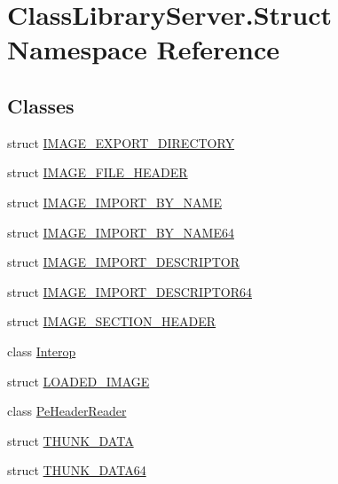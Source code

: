 \hypertarget{namespace_class_library_server_1_1_struct}{}\section{Class\+Library\+Server.\+Struct Namespace Reference}
\label{namespace_class_library_server_1_1_struct}
\subsection*{Classes}
\begin{DoxyCompactItemize}
\item 
struct \mbox{\hyperlink{struct_class_library_server_1_1_struct_1_1_i_m_a_g_e___e_x_p_o_r_t___d_i_r_e_c_t_o_r_y}{I\+M\+A\+G\+E\+\_\+\+E\+X\+P\+O\+R\+T\+\_\+\+D\+I\+R\+E\+C\+T\+O\+RY}}
\item 
struct \mbox{\hyperlink{struct_class_library_server_1_1_struct_1_1_i_m_a_g_e___f_i_l_e___h_e_a_d_e_r}{I\+M\+A\+G\+E\+\_\+\+F\+I\+L\+E\+\_\+\+H\+E\+A\+D\+ER}}
\item 
struct \mbox{\hyperlink{struct_class_library_server_1_1_struct_1_1_i_m_a_g_e___i_m_p_o_r_t___b_y___n_a_m_e}{I\+M\+A\+G\+E\+\_\+\+I\+M\+P\+O\+R\+T\+\_\+\+B\+Y\+\_\+\+N\+A\+ME}}
\item 
struct \mbox{\hyperlink{struct_class_library_server_1_1_struct_1_1_i_m_a_g_e___i_m_p_o_r_t___b_y___n_a_m_e64}{I\+M\+A\+G\+E\+\_\+\+I\+M\+P\+O\+R\+T\+\_\+\+B\+Y\+\_\+\+N\+A\+M\+E64}}
\item 
struct \mbox{\hyperlink{struct_class_library_server_1_1_struct_1_1_i_m_a_g_e___i_m_p_o_r_t___d_e_s_c_r_i_p_t_o_r}{I\+M\+A\+G\+E\+\_\+\+I\+M\+P\+O\+R\+T\+\_\+\+D\+E\+S\+C\+R\+I\+P\+T\+OR}}
\item 
struct \mbox{\hyperlink{struct_class_library_server_1_1_struct_1_1_i_m_a_g_e___i_m_p_o_r_t___d_e_s_c_r_i_p_t_o_r64}{I\+M\+A\+G\+E\+\_\+\+I\+M\+P\+O\+R\+T\+\_\+\+D\+E\+S\+C\+R\+I\+P\+T\+O\+R64}}
\item 
struct \mbox{\hyperlink{struct_class_library_server_1_1_struct_1_1_i_m_a_g_e___s_e_c_t_i_o_n___h_e_a_d_e_r}{I\+M\+A\+G\+E\+\_\+\+S\+E\+C\+T\+I\+O\+N\+\_\+\+H\+E\+A\+D\+ER}}
\item 
class \mbox{\hyperlink{class_class_library_server_1_1_struct_1_1_interop}{Interop}}
\item 
struct \mbox{\hyperlink{struct_class_library_server_1_1_struct_1_1_l_o_a_d_e_d___i_m_a_g_e}{L\+O\+A\+D\+E\+D\+\_\+\+I\+M\+A\+GE}}
\item 
class \mbox{\hyperlink{class_class_library_server_1_1_struct_1_1_pe_header_reader}{Pe\+Header\+Reader}}
\item 
struct \mbox{\hyperlink{struct_class_library_server_1_1_struct_1_1_t_h_u_n_k___d_a_t_a}{T\+H\+U\+N\+K\+\_\+\+D\+A\+TA}}
\item 
struct \mbox{\hyperlink{struct_class_library_server_1_1_struct_1_1_t_h_u_n_k___d_a_t_a64}{T\+H\+U\+N\+K\+\_\+\+D\+A\+T\+A64}}
\end{DoxyCompactItemize}
